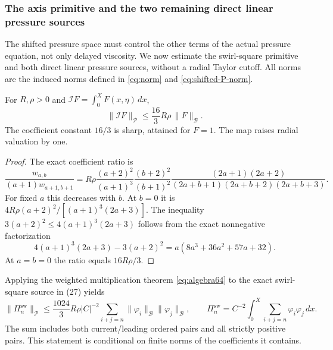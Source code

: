 \subsubsection*{The axis primitive and the two remaining direct linear pressure sources}
\label{subsec:direct-pressure-shifted}
The shifted pressure space must control the other terms of the actual
pressure equation, not only delayed viscosity. We now estimate the
swirl-square primitive and both direct linear pressure sources, without
a radial Taylor cutoff. All norms are the induced norms defined in
\eqref{eq:norm} and \eqref{eq:shifted-P-norm}.

\begin{lemma}
\label{lem:shifted-axis-primitive}
For $R,\rho>0$ and $\mathcal IF=\int_0^X F(x,\eta)\,dx$,
\[
\|\mathcal IF\|_{\mathcal P}
\le\frac{16}{3}R\rho\,\|F\|_{\mathcal B}.
\]
The coefficient constant $16/3$ is sharp, attained for $F=1$.
The map raises radial valuation by one.
\end{lemma}
\begin{proof}
The exact coefficient ratio is
\[
\frac{w_{a,b}}{(a+1)w_{a+1,b+1}}
=R\rho\frac{(a+2)^2}{(a+1)^3}
\frac{(b+2)^2}{(b+1)^2}
\frac{(2a+1)(2a+2)}
{(2a+b+1)(2a+b+2)(2a+b+3)}.
\]
For fixed $a$ this decreases with $b$. At $b=0$ it is
$4R\rho(a+2)^2/[(a+1)^3(2a+3)]$.
The inequality $3(a+2)^2\le4(a+1)^3(2a+3)$ follows
from the exact nonnegative factorization
\[
4(a+1)^3(2a+3)-3(a+2)^2
=a(8a^3+36a^2+57a+32).
\]
At $a=b=0$ the ratio equals $16R\rho/3$.
\end{proof}

Applying the weighted multiplication theorem \eqref{eq:algebra64}
to the exact swirl-square source in (27) yields
\begin{equation}\label{eq:swirl-P-source}
\|\Pi_n^{\mathrm{sw}}\|_{\mathcal P}
\le\frac{1024}{3}R\rho|C|^{-2}
\sum_{i+j=n}\|\varphi_i\|_{\mathcal B}
\|\varphi_j\|_{\mathcal B},
\qquad
\Pi_n^{\mathrm{sw}}=C^{-2}\int_0^X\sum_{i+j=n}\varphi_i\varphi_j\,dx.
\end{equation}
The sum includes both current/leading ordered pairs and all
strictly positive pairs. This statement is conditional on finite
norms of the coefficients it contains.

